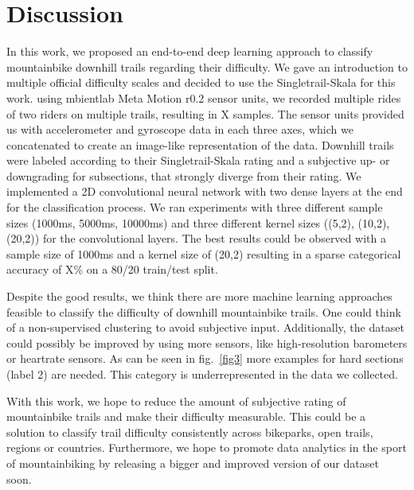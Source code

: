 \documentclass[runningheads]{llncs}
\begin{document}
\section{Discussion}
In this work, we proposed an end-to-end deep learning approach to classify mountainbike downhill trails regarding their difficulty. 
We gave an introduction to multiple official difficulty scales and decided to use the Singletrail-Skala for this work.
using mbientlab Meta Motion r0.2 sensor units, we recorded multiple rides of two riders on multiple trails, resulting in X samples. %
The sensor units provided us with accelerometer and gyroscope data in each three axes, which we concatenated to create an image-like representation of the data.
Downhill trails were labeled according to their Singletrail-Skala rating and a subjective up- or downgrading for subsections, that strongly diverge from their rating.
We implemented a 2D convolutional neural network with two dense layers at the end for the classification process.
We ran experiments with three different sample sizes (1000ms, 5000ms, 10000ms) and three different kernel sizes ((5,2), (10,2), (20,2)) for the convolutional layers.
The best results could be observed with a sample size of 1000ms and a kernel size of (20,2) resulting in a sparse categorical accuracy of X\% on a 80/20 train/test split. %


Despite the good results, we think there are more machine learning approaches feasible to classify the difficulty of downhill mountainbike trails. 
One could think of a non-supervised clustering to avoid subjective input.
Additionally, the dataset could possibly be improved by using more sensors, like high-resolution barometers or heartrate sensors.
As can be seen in fig.~\ref{fig3} more examples for hard sections (label 2) are needed.
This category is underrepresented in the data we collected.

With this work, we hope to reduce the amount of subjective rating of mountainbike trails and make their difficulty measurable.
This could be a solution to classify trail difficulty consistently across bikeparks, open trails, regions or countries.
Furthermore, we hope to promote data analytics in the sport of mountainbiking by releasing a bigger and improved version of our dataset soon.




\end{document}
